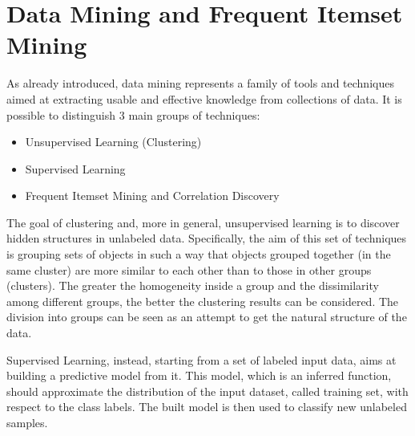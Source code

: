 \section{Data Mining and Frequent Itemset Mining}
As already introduced, data mining represents a family of tools and techniques aimed at extracting usable and effective knowledge from collections of data. It is possible to distinguish 3 main groups of techniques:
\begin{itemize}
\item Unsupervised Learning (Clustering)~\cite{Xu_2005SurveyClustering}
\item Supervised Learning~\cite{AggarwalBookClassification}
\item Frequent Itemset Mining and Correlation Discovery~\cite{Han_2007SurveyFIM}
\end{itemize}

The goal of clustering and, more in general, unsupervised learning is to discover hidden structures in unlabeled data. Specifically, the aim of this set of techniques is grouping sets of objects in such a way that objects grouped together (in the same cluster) are more similar to each other than to those in other groups (clusters). The greater the homogeneity inside a group and the dissimilarity among different groups, the better the clustering results can be considered. The division into groups can be seen as an attempt to get the natural structure of the data.

Supervised Learning, instead, starting from a set of labeled input data, aims at building a predictive model from it. This model, which is an inferred function, should approximate the distribution of the input dataset, called training set, with respect to the class labels. The built model is then used to classify new unlabeled samples. 

